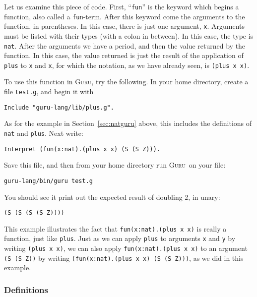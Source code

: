 \documentclass{book}[12pt]
\newcommand{\guru}[0]{\textsc{Guru}}
\begin{document}
\noindent Let us examine this piece of code.  First, ``\texttt{fun}''
is the keyword which begins a function, also called a
\texttt{fun}-term.  After this keyword come the arguments to
the function, in parentheses.  In this case, there is just one
argument, \texttt{x}.  Arguments must be listed with their types (with
a colon in between).  In this case, the type is \texttt{nat}.  After
the arguments we have a period, and then the value returned by the
function.  In this case, the value returned is just the result of the
application of \texttt{plus} to \texttt{x} and \texttt{x}, for which
the notation, as we have already seen, is \texttt{(plus x x)}.

To use this function in \guru, try the following.  In your home
directory, create a file \texttt{test.g}, and begin it with

\begin{verbatim}
Include "guru-lang/lib/plus.g".
\end{verbatim}

\noindent As for the example in Section~\ref{sec:natguru} above,
this includes the definitions of \texttt{nat} and \texttt{plus}.
Next write:

\begin{verbatim}
Interpret (fun(x:nat).(plus x x) (S (S Z))).
\end{verbatim}

\noindent Save this file, and then from your home directory run
\guru\ on your file:

\begin{verbatim}
guru-lang/bin/guru test.g
\end{verbatim}

\noindent You should see it print out the expected result of doubling
2, in unary:

\begin{verbatim}
(S (S (S (S Z))))
\end{verbatim}

\noindent This example illustrates the fact that
\texttt{fun(x:nat).(plus x x)} is really a function, just like
\texttt{plus}.  Just as we can apply \texttt{plus} to arguments
\texttt{x} and \texttt{y} by writing \texttt{(plus x x)}, we can also
apply \texttt{fun(x:nat).(plus x x)} to an argument \texttt{(S (S Z))}
by writing \texttt{(fun(x:nat).(plus x x) (S (S Z)))}, as we did in
this example.

\subsubsection{Definitions}
\end{document}
